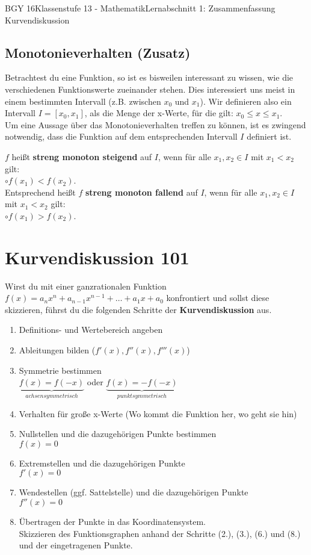 \documentclass[11pt,twocolumn,oneside,openany,headings=optiontotoc,11pt,numbers=noenddot]{article}
\begin{document}
\begin{worksheet}{BGY 16}{Klassenstufe 13 - Mathematik}{Lernabschnitt 1: Zusammenfassung Kurvendiskussion}
		\subsection*{Monotonieverhalten \tiny{(Zusatz)}\normalsize} Betrachtest du eine Funktion, so ist es bisweilen interessant zu wissen, wie die verschiedenen Funktionswerte zueinander stehen. Dies interessiert uns meist in einem bestimmten Intervall (z.B. zwischen \(x_0\) und \(x_1\)). Wir definieren also ein Intervall \(I = [x_0,x_1]\), als die Menge der x-Werte, für die gilt: \(x_0 \leq x \leq x_1\).\\
		Um eine Aussage über das Monotonieverhalten treffen zu können, ist es zwingend notwendig, dass die Funktion auf dem entsprechenden Intervall \(I\) definiert ist.\\
		\par\noindent
		\(f\) heißt \textbf{streng monoton steigend} auf \(I\), wenn für alle \(x_1,x_2 \in I\) mit \(x_1<x_2\) gilt:\\
		\(\circ f(x_1)<f(x_2)\).\\
		Entsprechend heißt \(f\) \textbf{streng monoton fallend} auf \(I\), wenn für alle \(x_1,x_2 \in I\) mit \(x_1<x_2\) gilt:\\
		\(\circ f(x_1) > f(x_2)\).
		\newpage
		\section{Kurvendiskussion 101}
		Wirst du mit einer ganzrationalen Funktion \(f(x) = a_nx^n + a_{n-1}x^{n-1} +\ldots + a_1x +a_0\) konfrontiert und sollst diese skizzieren, führst du die folgenden Schritte der \textbf{Kurvendiskussion} aus.\\
		\begin{enumerate}
			\item Definitions- und Wertebereich angeben
			\item Ableitungen bilden (\(f'(x), f''(x), f'''(x)\))
			\item Symmetrie bestimmen\\
			\(\underbrace{f(x) = f(-x)}_{achsensymmetrisch}\) oder \(\underbrace{f(x) = -f(-x)}_{punktsymmetrisch}\)
			\item Verhalten für große x-Werte (\tiny{Wo kommt die Funktion her, wo geht sie hin}\normalsize)
			\item Nullstellen und die dazugehörigen Punkte bestimmen\\
			\(f(x) = 0\)
			\item Extremstellen und die dazugehörigen Punkte\\
			\(f'(x) = 0\)
			\item Wendestellen (ggf. Sattelstelle) und die dazugehörigen Punkte\\
			\(f''(x) = 0\)
			\item Übertragen der Punkte in das Koordinatensystem.\\
			Skizzieren des Funktionsgraphen anhand der Schritte (2.), (3.), (6.) und (8.) und der eingetragenen Punkte.
		\end{enumerate}
	\end{worksheet}
\end{document}
